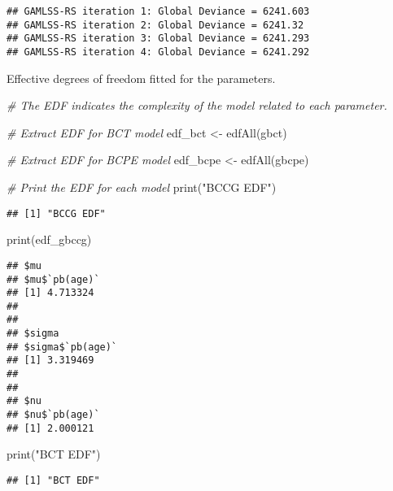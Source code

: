 \documentclass[
]{article}
\newenvironment{Shaded}{\begin{snugshade}}{\end{snugshade}}
\newcommand{\CommentTok}[1]{\textcolor[rgb]{0.56,0.35,0.01}{\textit{#1}}}
\newcommand{\FunctionTok}[1]{\textcolor[rgb]{0.00,0.00,0.00}{#1}}
\newcommand{\NormalTok}[1]{#1}
\newcommand{\OtherTok}[1]{\textcolor[rgb]{0.56,0.35,0.01}{#1}}
\newcommand{\StringTok}[1]{\textcolor[rgb]{0.31,0.60,0.02}{#1}}
\begin{document}
\begin{verbatim}
## GAMLSS-RS iteration 1: Global Deviance = 6241.603 
## GAMLSS-RS iteration 2: Global Deviance = 6241.32 
## GAMLSS-RS iteration 3: Global Deviance = 6241.293 
## GAMLSS-RS iteration 4: Global Deviance = 6241.292
\end{verbatim}

Effective degrees of freedom fitted for the parameters.

\begin{Shaded}
\begin{Highlighting}[]
\CommentTok{\# The EDF indicates the complexity of the model related to each parameter.}

\CommentTok{\# Extract EDF for BCT model}
\NormalTok{edf\_bct }\OtherTok{\textless{}{-}} \FunctionTok{edfAll}\NormalTok{(gbct)}

\CommentTok{\# Extract EDF for BCPE model}
\NormalTok{edf\_bcpe }\OtherTok{\textless{}{-}} \FunctionTok{edfAll}\NormalTok{(gbcpe)}

\CommentTok{\# Print the EDF for each model}
\FunctionTok{print}\NormalTok{(}\StringTok{"BCCG EDF"}\NormalTok{)}
\end{Highlighting}
\end{Shaded}

\begin{verbatim}
## [1] "BCCG EDF"
\end{verbatim}

\begin{Shaded}
\begin{Highlighting}[]
\FunctionTok{print}\NormalTok{(edf\_gbccg)}
\end{Highlighting}
\end{Shaded}

\begin{verbatim}
## $mu
## $mu$`pb(age)`
## [1] 4.713324
## 
## 
## $sigma
## $sigma$`pb(age)`
## [1] 3.319469
## 
## 
## $nu
## $nu$`pb(age)`
## [1] 2.000121
\end{verbatim}

\begin{Shaded}
\begin{Highlighting}[]
\FunctionTok{print}\NormalTok{(}\StringTok{"BCT EDF"}\NormalTok{)}
\end{Highlighting}
\end{Shaded}

\begin{verbatim}
## [1] "BCT EDF"
\end{verbatim}
\end{document}
